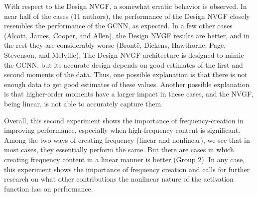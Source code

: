 With respect to the Design NVGF, a somewhat erratic behavior is observed. In near half of the cases ($11$ authors), the performance of the Design NVGF closely resembles the performance of the GCNN, as expected. In a few other cases (Alcott, James, Cooper, and Allen), the Design NVGF results are better, and in the rest they are considerably worse (Bront\"{e}, Dickens, Hawthorne, Page, Stevenson, and Melville). The Design NVGF architecture is designed to mimic the GCNN, but its accurate design depends on good estimates of the first and second moments of the data. Thus, one possible explanation is that there is not enough data to get good estimates of these values. Another possible explanation is that higher-order moments have a larger impact in these cases, and the NVGF, being linear, is not able to accurately capture them.

Overall, this second experiment shows the importance of frequency-creation in improving performance, especially when high-frequency content is significant. Among the two ways of creating frequency (linear and nonlinear), we see that in most cases, they essentially perform the same. But there are cases in which creating frequency content in a linear manner is better (Group 2). In any case, this experiment shows the importance of frequency creation and calls for further research on what other contributions the nonlinear nature of the activation function has on performance.